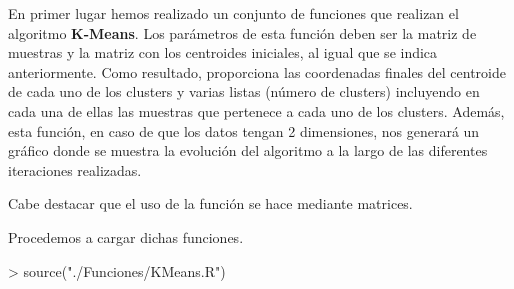 \documentclass [a4paper] {article}
\begin{document}
\bigskip
En primer lugar hemos realizado un conjunto de funciones que realizan el algoritmo \textbf{K-Means}. Los parámetros
de esta función deben ser la matriz de muestras y la matriz con los centroides iniciales, al igual que se indica 
anteriormente. Como resultado, proporciona las coordenadas finales del centroide de cada uno de los clusters y varias
listas (número de clusters) incluyendo en cada una de ellas las muestras que pertenece a cada uno de los clusters.
Además, esta función, en caso de que los datos tengan 2 dimensiones, nos generará un gráfico donde se muestra la 
evolución del algoritmo a la largo de las diferentes iteraciones realizadas. 

Cabe destacar que el uso de la función se hace mediante matrices.

\bigskip
Procedemos a cargar dichas funciones.
\begin{Schunk}
\begin{Sinput}
> source("./Funciones/KMeans.R")
\end{Sinput}
\end{Schunk}
\end{document}
